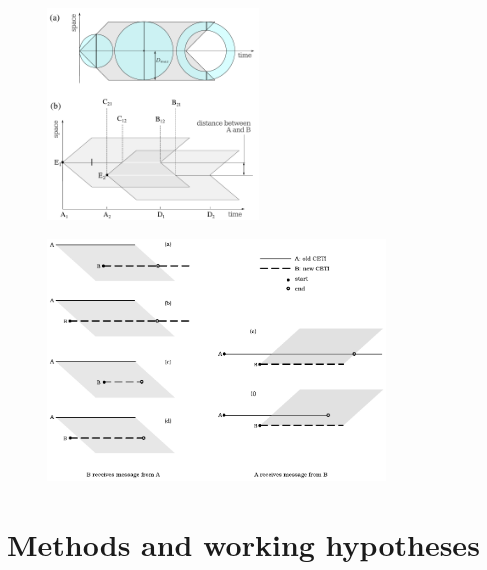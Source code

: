 
\begin{figure}
   \centering
   \includegraphics[width=0.5\textwidth]{scheme.pdf}
    \label{F_scheme}
\end{figure}
 
\begin{figure}
   \centering
   \includegraphics[width=0.8\textwidth]{Messages_01.pdf}
    \label{F_messages}
\end{figure}
      

\section{Methods and working hypotheses}\label{S_methods}

